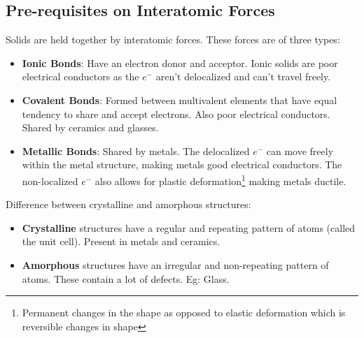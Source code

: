 \documentclass[12pt]{article}
\begin{document}
\subsection{Pre-requisites on Interatomic Forces}
Solids are held together by interatomic forces. These forces are of three
types:
\begin{itemize}
    \item \textbf{Ionic Bonds}: Have an electron donor and acceptor. Ionic solids are poor electrical conductors as the $e^{-}$ aren't delocalized and can't travel freely.
    \item \textbf{Covalent Bonds}: Formed between multivalent elements that have equal tendency to share and accept electrons. Also poor electrical conductors. Shared by ceramics and glasses.
    \item \textbf{Metallic Bonds}: Shared by metals. The delocalized $e^{-}$ can move freely within the metal structure, making metals good electrical conductors. The non-localized $e^{-}$ also allows for plastic deformation\footnote{Permanent changes in the shape as opposed to elastic deformation which is reversible changes in shape} making metals ductile.
\end{itemize}

\noindent
Difference between crystalline and amorphous structures:
\begin{itemize}
    \item \textbf{Crystalline} structures have a regular and repeating pattern of atoms (called the unit cell). Present in metals and ceramics.
    \item \textbf{Amorphous} structures have an irregular and non-repeating pattern of atoms. These contain a lot of defects. Eg: Glass.
\end{itemize}
\end{document}
